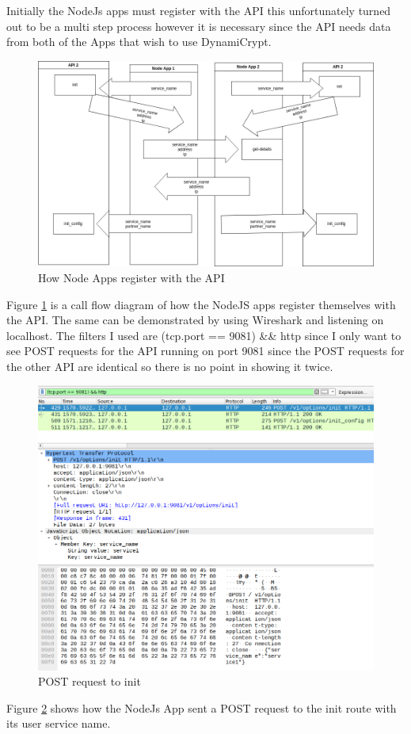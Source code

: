 Initially the NodeJs apps must register with the API this unfortunately turned out to be a multi step process however it is necessary since the API needs data from both of the Apps that wish to use DynamiCrypt.

\begin{figure}[!h]
  \centering
      \includegraphics[width=1\textwidth]{Figures/connect_code_flow.png}
  \caption[How Node Apps register with the API]{How Node Apps register with the API}
  \label{fig:b3}
\end{figure}
\FloatBarrier

Figure \ref{fig:b3} is a call flow diagram of how the NodeJS apps register themselves with the API.
The same can be demonstrated by using Wireshark and listening on localhost. The filters I used are (tcp.port == 9081) && http since I only want to see POST requests for the API running on port 9081 since the POST requests for the other API are identical so there is no point in showing it twice.

\begin{figure}[!h]
  \centering
      \includegraphics[width=1\textwidth]{Figures/b4.png}
  \caption[POST request to init]{POST request to init}
  \label{fig:b4}
\end{figure}
\FloatBarrier
Figure \ref{fig:b4} shows how the NodeJs App sent a POST request to the init route with its user service name. 

